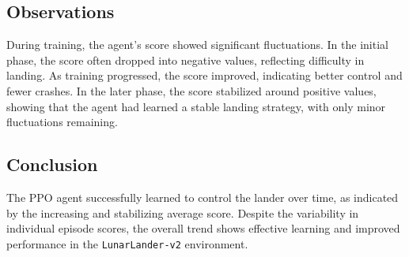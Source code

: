 \documentclass[conference]{IEEEtran}
\begin{document}
\subsection*{Observations}



During training, the agent's score showed significant fluctuations. In the initial phase, the score often dropped into negative values, reflecting difficulty in landing. As training progressed, the score improved, indicating better control and fewer crashes. In the later phase, the score stabilized around positive values, showing that the agent had learned a stable landing strategy, with only minor fluctuations remaining.


\subsection*{Conclusion}
The PPO agent successfully learned to control the lander over time, as indicated by the increasing and stabilizing average score. Despite the variability in individual episode scores, the overall trend shows effective learning and improved performance in the \texttt{LunarLander-v2} environment.






\end{document}

